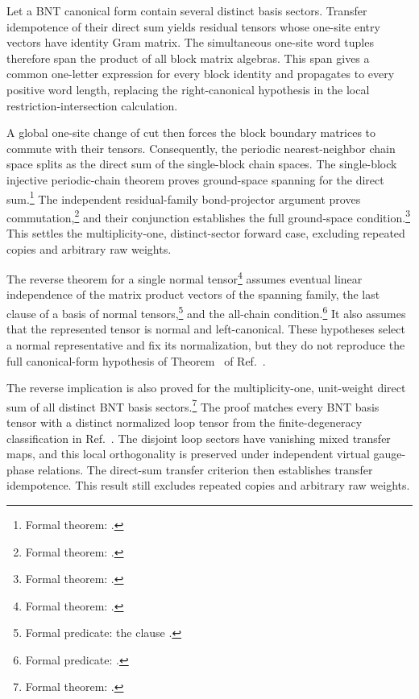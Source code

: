 \documentclass{article}
\begin{document}
Let a BNT canonical form contain several distinct basis sectors. Transfer
idempotence of their direct sum yields residual tensors whose one-site entry
vectors have identity Gram matrix. The simultaneous one-site word tuples
therefore span the product of all block matrix algebras. This span gives a
common one-letter expression for every block identity and propagates to every
positive word length, replacing the right-canonical hypothesis in the local
restriction-intersection calculation.

A global one-site change of cut then forces the block boundary matrices to
commute with their tensors. Consequently, the periodic nearest-neighbor chain
space splits as the direct sum of the single-block chain spaces. The
single-block injective periodic-chain theorem proves ground-space spanning for
the direct sum.\footnote{Formal theorem:
.}
The independent residual-family bond-projector argument proves
commutation,\footnote{Formal theorem:
.} and
their conjunction establishes the full ground-space condition.\footnote{Formal
theorem:
.}
This settles the multiplicity-one, distinct-sector forward case, excluding
repeated copies and arbitrary raw weights.

The reverse theorem for a single normal tensor\footnote{Formal theorem:
.} assumes eventual linear independence
of the matrix product vectors of the spanning family, the last clause of a basis
of normal tensors,\footnote{Formal predicate: the clause
.} and the all-chain
condition.\footnote{Formal predicate: .}
It also assumes that the represented tensor is normal and left-canonical.
These hypotheses select a normal representative and fix its normalization, but
they do not reproduce the full canonical-form hypothesis of
Theorem~ of Ref.~\cite{Cirac2016MPDO_arXiv}.

The reverse implication is also proved for the multiplicity-one, unit-weight
direct sum of all distinct BNT basis sectors.\footnote{Formal theorem:
.}
The proof matches every BNT basis tensor with a distinct normalized loop tensor
from the finite-degeneracy classification in Ref.~\cite{Cirac2016MPDO_arXiv}.
The disjoint loop sectors have vanishing mixed transfer maps, and this local
orthogonality is preserved under independent virtual gauge-phase relations.
The direct-sum transfer criterion then establishes transfer idempotence. This
result still excludes repeated copies and arbitrary raw weights.
\end{document}
